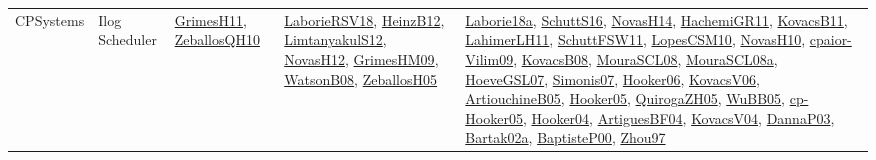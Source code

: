 {\begin{longtable}{lp{3cm}>{\raggedright}p{6cm}>{\raggedright}p{6cm}p{8cm}}
CPSystems & Ilog Scheduler & \href{papers/GrimesH11.pdf}{GrimesH11}\cite{GrimesH11}, \href{articles/ZeballosQH10.pdf}{ZeballosQH10}\cite{ZeballosQH10} & \href{articles/LaborieRSV18.pdf}{LaborieRSV18}\cite{LaborieRSV18}, \href{papers/HeinzB12.pdf}{HeinzB12}\cite{HeinzB12}, \href{articles/LimtanyakulS12.pdf}{LimtanyakulS12}\cite{LimtanyakulS12}, \href{articles/NovasH12.pdf}{NovasH12}\cite{NovasH12}, \href{papers/GrimesHM09.pdf}{GrimesHM09}\cite{GrimesHM09}, \href{papers/WatsonB08.pdf}{WatsonB08}\cite{WatsonB08}, \href{articles/ZeballosH05.pdf}{ZeballosH05}\cite{ZeballosH05} & \href{papers/Laborie18a.pdf}{Laborie18a}\cite{Laborie18a}, \href{papers/SchuttS16.pdf}{SchuttS16}\cite{SchuttS16}, \href{articles/NovasH14.pdf}{NovasH14}\cite{NovasH14}, \href{articles/HachemiGR11.pdf}{HachemiGR11}\cite{HachemiGR11}, \href{articles/KovacsB11.pdf}{KovacsB11}\cite{KovacsB11}, \href{papers/LahimerLH11.pdf}{LahimerLH11}\cite{LahimerLH11}, \href{articles/SchuttFSW11.pdf}{SchuttFSW11}\cite{SchuttFSW11}, \href{articles/LopesCSM10.pdf}{LopesCSM10}\cite{LopesCSM10}, \href{articles/NovasH10.pdf}{NovasH10}\cite{NovasH10}, \href{papers/cpaior-Vilim09.pdf}{cpaior-Vilim09}\cite{cpaior-Vilim09}, \href{articles/KovacsB08.pdf}{KovacsB08}\cite{KovacsB08}, \href{papers/MouraSCL08.pdf}{MouraSCL08}\cite{MouraSCL08}, \href{papers/MouraSCL08a.pdf}{MouraSCL08a}\cite{MouraSCL08a}, \href{papers/HoeveGSL07.pdf}{HoeveGSL07}\cite{HoeveGSL07}, \href{articles/Simonis07.pdf}{Simonis07}\cite{Simonis07}, \href{articles/Hooker06.pdf}{Hooker06}\cite{Hooker06}, \href{papers/KovacsV06.pdf}{KovacsV06}\cite{KovacsV06}, \href{papers/ArtiouchineB05.pdf}{ArtiouchineB05}\cite{ArtiouchineB05}, \href{articles/Hooker05.pdf}{Hooker05}\cite{Hooker05}, \href{papers/QuirogaZH05.pdf}{QuirogaZH05}\cite{QuirogaZH05}, \href{papers/WuBB05.pdf}{WuBB05}\cite{WuBB05}, \href{papers/cp-Hooker05.pdf}{cp-Hooker05}\cite{cp-Hooker05}, \href{papers/Hooker04.pdf}{Hooker04}\cite{Hooker04}, \href{papers/ArtiguesBF04.pdf}{ArtiguesBF04}\cite{ArtiguesBF04}, \href{papers/KovacsV04.pdf}{KovacsV04}\cite{KovacsV04}, \href{papers/DannaP03.pdf}{DannaP03}\cite{DannaP03}, \href{papers/Bartak02a.pdf}{Bartak02a}\cite{Bartak02a}, \href{articles/BaptisteP00.pdf}{BaptisteP00}\cite{BaptisteP00}, \href{articles/Zhou97.pdf}{Zhou97}\cite{Zhou97}\\

\end{longtable}}
